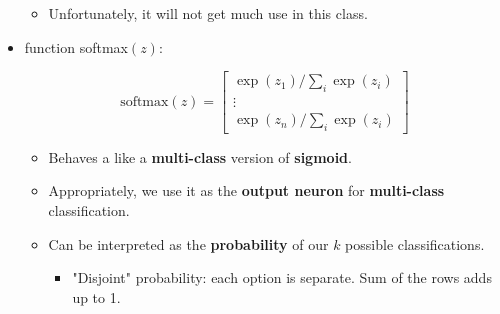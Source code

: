 \begin{itemize}
\begin{itemize}
                    \item Unfortunately, it will not get much use in this class.
                \end{itemize}
                
            \item {} function softmax$(z)$:
                
                \begin{equation}
                    \text{softmax}(z) =
                    \begin{bmatrix}
                        \exp(z_1) / \sum_{i} \exp(z_i) \\
                        \vdots \\
                        \exp(z_n) / \sum_{i} \exp(z_i)
                    \end{bmatrix}
                \end{equation}
                
                \begin{itemize}
                    \item Behaves a like a \textbf{multi-class} version of \textbf{sigmoid}.
                    
                    \item Appropriately, we use it as the \textbf{output neuron} for \textbf{multi-class} classification.
                    
                    \item Can be interpreted as the \textbf{probability} of our $k$ possible classifications.
                        \begin{itemize}
                            \item "Disjoint" probability: each option is separate. Sum of the rows adds up to 1.\\
                        \end{itemize}
                \end{itemize}
        \end{itemize}
        
